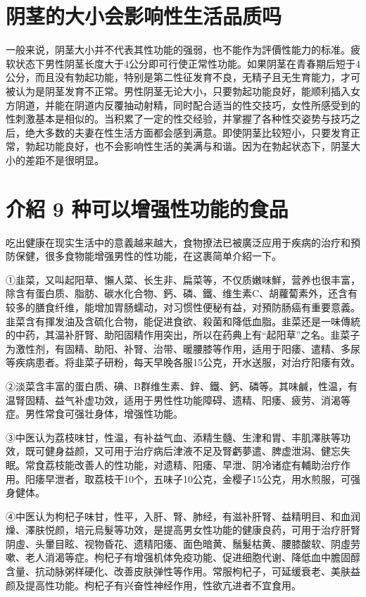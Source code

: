 \documentclass[12pt,UTF8]{ctexbook}
\begin{document}
\section{阴茎的大小会影响性生活品质吗}

一般来说，阴茎大小并不代表其性功能的强弱，也不能作为評價性能力的标准。疲软状态下男性阴茎长度大于4公分即可行使正常性功能。如果阴茎在青春期后短于4公分，而且没有勃起功能，特别是第二性征发育不良，无精子且无生育能力，才可被认为是阴茎发育不正常。男性阴茎无论大小，只要勃起功能良好，能顺利插入女方阴道，并能在阴道内反覆抽动射精，同时配合适当的性交技巧，女性所感受到的性刺激基本是相似的。当积累了一定的性交经验，并掌握了各种性交姿势与技巧之后，绝大多数的夫妻在性生活方面都会感到满意。即使阴茎比较短小，只要发育正常，勃起功能良好，也不会影响性生活的美满与和谐。因为在勃起状态下，阴茎大小的差距不是很明显。

\section{介紹 9 种可以增强性功能的食品}

吃出健康在现实生活中的意義越来越大，食物撩法已被廣泛应用于疾病的治疗和預防保健，很多食物能增强男性的性功能，在这裹简单介紹一下。

①韭菜，又叫起阳草、懶人菜、长生非、扁菜等，不仅质嫩味鮮，营养也很丰富，除含有蛋白质、脂肪、碳水化合物、鈣、磷、鐵、维生素C、胡蘿蔔素外，还含有较多的膳食纤维，能增加胃肠蠕动，对习惯性便秘有益，对預防肠癌有重要意義。韭菜含有揮发油及含硫化合物，能促进食欲、殺菌和降低血脂。韭菜还是一味傳統的中药，其温补肝腎、助阳固精作用突出，所以在药典上有“起阳草”之名。韭菜子为激性剂，有固精、助阳、补腎、治带、暖腰膝等作用，适用于阳痿、遣精、多尿等疾病患者。将韭菜子研粉，每天早晚各服15公克，开水送服，对治疗阳痿有效。

②淡菜含丰富的蛋白质、碘、B群维生素、鋅、鐵、鈣、磷等。其味鹹，性温，有温腎固精、益气补虚功效，适用于男性性功能障碍、遗精、阳痿、疲劳、消渴等症。男性常食可强壮身体，增强性功能。

③中医认为荔枝味甘，性温，有补益气血、添精生髓、生津和胃、丰肌澤肤等功效，既可健身益颜，又可用于治疗病后津液不足及腎虧夢遣、脾虚泄潟、健忘失眠。常食荔枝能改善人的性功能，对遗精、阳痿、早泄、阴冷诸症有輔助治疗作用。阳痿早泄者，取荔枝干10个，五味子10公克，金樱子15公克，用水煎服，可强身健体。

④中医认为枸杞子味甘，性平，入肝、腎、肺经，有滋补肝腎、益精明目、和血润燥、澤肤悦颜，培元烏髮等功效，是提高男女性功能的健康良药，可用于治疗肝腎阴虛、头暈目眩、视物昏花、遗精阳痿、面色暗黄、鬚髮枯黄、腰膝酸软、阴虛劳嗽、老人消渴等症。枸杞子有增强机体免疫功能、促进细胞代谢、降低血中膽固醇含量、抗动脉粥样硬化、改善皮肤弹性等作用。常服枸杞子，可延缓衰老、美肤益颜及提高性功能。枸杞子有兴奋性神经作用，性欲亢进者不宜食用。
\end{document}
